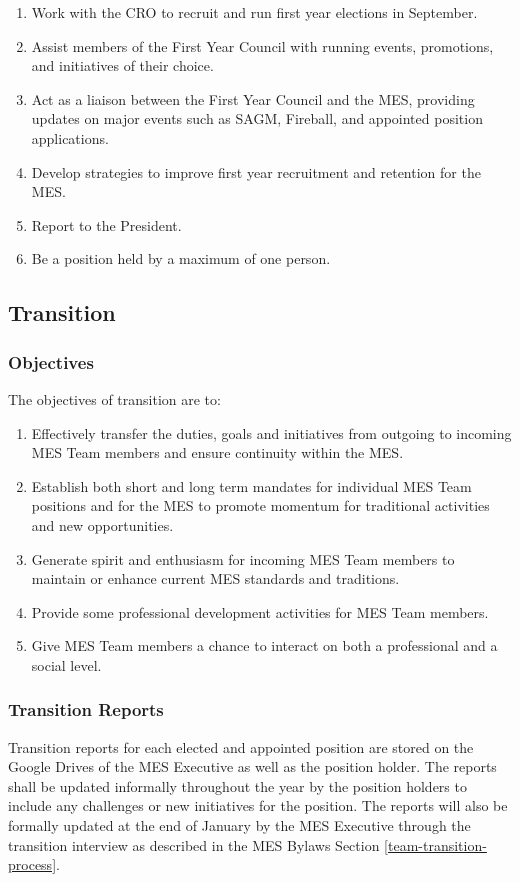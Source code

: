 \begin{enumerate}
 \item
  Work with the CRO to recruit and run first year elections in September.
 \item
  Assist members of the First Year Council with running events, promotions, and initiatives of their choice.
 \item
  Act as a liaison between the First Year Council and the MES, providing updates on major events such as SAGM, Fireball, and appointed position applications.
 \item
  Develop strategies to improve first year recruitment and retention for the MES.
 \item
  Report to the President.
 \item
  Be a position held by a maximum of one person.
\end{enumerate}

\subsection{Transition}
\label{transition}
\subsubsection{Objectives}
\label{objectives}
The objectives of transition are to:

\begin{enumerate}
 \item
  Effectively transfer the duties, goals and initiatives from outgoing to incoming MES Team members and ensure continuity within the MES.
 \item
  Establish both short and long term mandates for individual MES Team positions and for the MES to promote momentum for traditional activities and new opportunities.
 \item
  Generate spirit and enthusiasm for incoming MES Team members to maintain or enhance current MES standards and traditions.
 \item
  Provide some professional development activities for MES Team members.
 \item
  Give MES Team members a chance to interact on both a professional and a social level.

\end{enumerate}

\subsubsection{Transition Reports}
\label{transition-reports}
Transition reports for each elected and appointed position are stored on
the Google Drives of the MES Executive as well as the position holder.
The reports shall be updated informally throughout the year by the
position holders to include any challenges or new initiatives for the
position. The reports will also be formally updated at the end of
January by the MES Executive through the transition interview as
described in the MES Bylaws Section \ref{team-transition-process}. %

